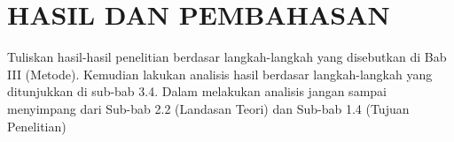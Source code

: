 \chapter{\uppercase{hasil dan pembahasan}} \label{bab4}
Tuliskan hasil-hasil penelitian berdasar langkah-langkah yang disebutkan di Bab III (Metode). Kemudian lakukan analisis hasil berdasar langkah-langkah yang ditunjukkan di sub-bab 3.4. Dalam melakukan analisis jangan sampai menyimpang dari Sub-bab 2.2 (Landasan Teori) dan Sub-bab 1.4 (Tujuan Penelitian)

